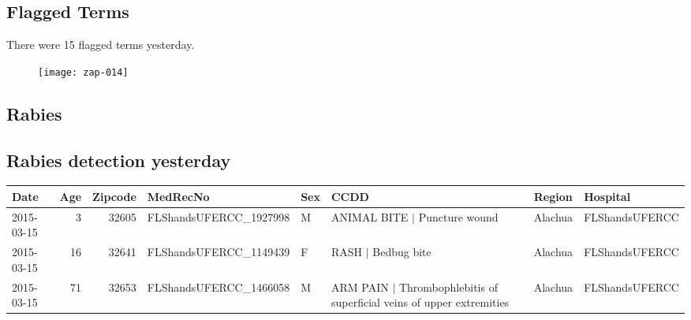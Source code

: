 \documentclass[12pt]{article}
\begin{document}
\begin{center}
\section*{Flagged Terms}
\end{center}


There were 15 flagged terms yesterday. 

\begin{figure}[H]
\begin{center}
\texttt{[image: zap-014]}
\end{center}
\end{figure}

\newpage

\begin{center}
\section*{Rabies}

\end{center}

\subsection*{Rabies detection yesterday}


\begin{table}[H]
\begin{table}[ht]
\centering
{\tiny
\begin{tabular}{lrrlllll}
  \hline
Date & Age & Zipcode & MedRecNo & Sex & CCDD & Region & Hospital \\ 
  \hline
2015-03-15 &   3 & 32605 & FLShandsUFERCC\_1927998 & M & ANIMAL BITE $|$ Puncture wound & Alachua & FLShandsUFERCC \\ 
  2015-03-15 &  16 & 32641 & FLShandsUFERCC\_1149439 & F & RASH $|$ Bedbug bite & Alachua & FLShandsUFERCC \\ 
  2015-03-15 &  71 & 32653 & FLShandsUFERCC\_1466058 & M & ARM PAIN $|$ Thrombophlebitis of superficial veins of upper extremities & Alachua & FLShandsUFERCC \\ 
   \hline
\end{tabular}
}
\end{table}\end{table}
\end{document}
